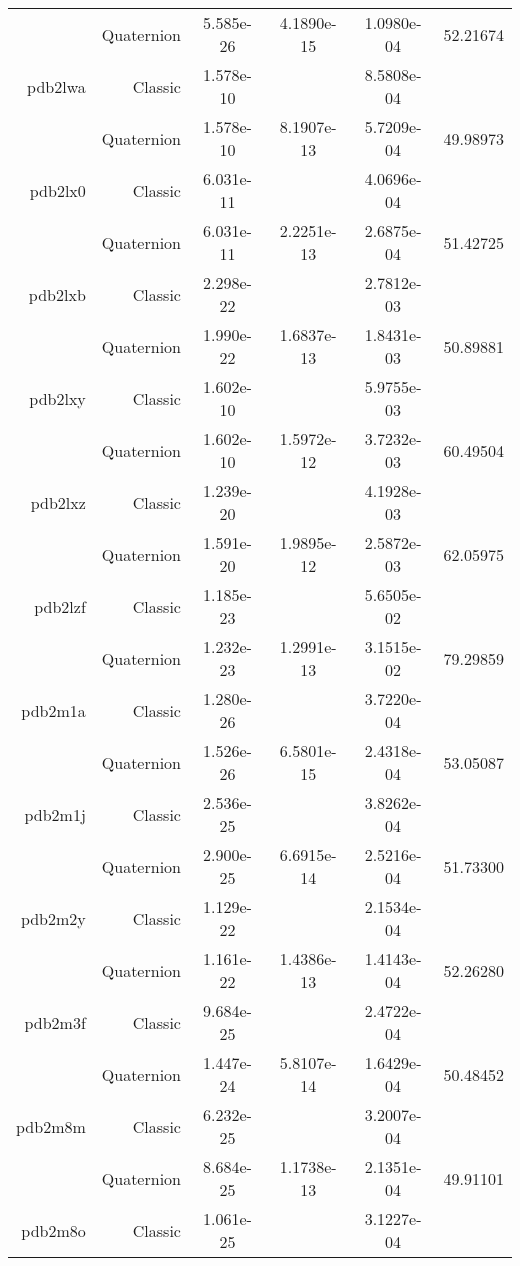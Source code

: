 \begin{xltabular}{\textwidth}{r|rS[table-format=1.3e+2]S[table-format=1.4e+2]S[table-format=1.4e+2]S[table-format=-1.5]}
& Quaternion & 5.585e-26 & 4.1890e-15 & 1.0980e-04 & 52.21674\\  \addlinespace
pdb2lwa & Classic & 1.578e-10 &  & 8.5808e-04 & \\
& Quaternion & 1.578e-10 & 8.1907e-13 & 5.7209e-04 & 49.98973\\  \addlinespace
pdb2lx0 & Classic & 6.031e-11 &  & 4.0696e-04 & \\
& Quaternion & 6.031e-11 & 2.2251e-13 & 2.6875e-04 & 51.42725\\  \addlinespace
pdb2lxb & Classic & 2.298e-22 &  & 2.7812e-03 & \\
& Quaternion & 1.990e-22 & 1.6837e-13 & 1.8431e-03 & 50.89881\\  \addlinespace
pdb2lxy & Classic & 1.602e-10 &  & 5.9755e-03 & \\
& Quaternion & 1.602e-10 & 1.5972e-12 & 3.7232e-03 & 60.49504\\  \addlinespace
pdb2lxz & Classic & 1.239e-20 &  & 4.1928e-03 & \\
& Quaternion & 1.591e-20 & 1.9895e-12 & 2.5872e-03 & 62.05975\\  \addlinespace
pdb2lzf & Classic & 1.185e-23 &  & 5.6505e-02 & \\
& Quaternion & 1.232e-23 & 1.2991e-13 & 3.1515e-02 & 79.29859\\  \addlinespace
pdb2m1a & Classic & 1.280e-26 &  & 3.7220e-04 & \\
& Quaternion & 1.526e-26 & 6.5801e-15 & 2.4318e-04 & 53.05087\\  \addlinespace
pdb2m1j & Classic & 2.536e-25 &  & 3.8262e-04 & \\
& Quaternion & 2.900e-25 & 6.6915e-14 & 2.5216e-04 & 51.73300\\  \addlinespace
pdb2m2y & Classic & 1.129e-22 &  & 2.1534e-04 & \\
& Quaternion & 1.161e-22 & 1.4386e-13 & 1.4143e-04 & 52.26280\\  \addlinespace
pdb2m3f & Classic & 9.684e-25 &  & 2.4722e-04 & \\
& Quaternion & 1.447e-24 & 5.8107e-14 & 1.6429e-04 & 50.48452\\  \addlinespace
pdb2m8m & Classic & 6.232e-25 &  & 3.2007e-04 & \\
& Quaternion & 8.684e-25 & 1.1738e-13 & 2.1351e-04 & 49.91101\\  \addlinespace
pdb2m8o & Classic & 1.061e-25 &  & 3.1227e-04 & \\

\end{xltabular}
